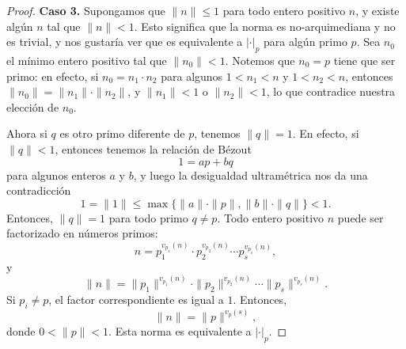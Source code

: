 \documentclass{article}
\numberwithin{equation}{section}
\theoremstyle{definition}
\begin{document}
\begin{proof}
  \noindent\textbf{Caso 3.} Supongamos que $\|n\| \le 1$ para todo entero
  positivo $n$, y existe algún $n$ tal que $\|n\| < 1$. Esto significa que
  la norma es no-arquimediana y no es trivial, y nos gustaría ver que es
  equivalente a $|\cdot|_p$ para algún primo $p$. Sea $n_0$ el mínimo entero
  positivo tal que $\|n_0\| < 1$. Notemos que $n_0 = p$ tiene que ser primo:
  en efecto, si $n_0 = n_1\cdot n_2$ para algunos $1 < n_1 < n$ y $1 < n_2 < n$,
  entonces $\|n_0\| = \|n_1\|\cdot \|n_2\|$, y $\|n_1\| < 1$ o $\|n_2\| < 1$,
  lo que contradice nuestra elección de $n_0$.

  Ahora si $q$ es otro primo diferente de $p$, tenemos $\|q\| = 1$. En efecto,
  si $\|q\| < 1$, entonces tenemos la relación de Bézout
  $$1 = ap + bq$$
  para algunos enteros $a$ y $b$, y luego la desigualdad ultramétrica nos da una
  contradicción
  $$1 = \|1\| \le \max \{ \|a\|\cdot \|p\|, \|b\|\cdot \|q\| \} < 1.$$
  Entonces, $\|q\| = 1$ para todo primo $q \ne p$. Todo entero positivo $n$
  puede ser factorizado en números primos:
  $$n = p_1^{v_{p_1} (n)}\cdot p_2^{v_{p_2} (n)}\cdots p_s^{v_{p_s} (n)},$$
  y
  \[ \|n\| =
     \|p_1\|^{v_{p_1} (n)}\cdot\|p_2\|^{v_{p_2}(n)}\cdots\|p_s\|^{v_{p_s}(n)}. \]
  Si $p_i \ne p$, el factor correspondiente es igual a $1$. Entonces,
  $$\|n\| = \|p\|^{v_p (s)},$$
  donde $0 < \|p\| < 1$. Esta norma es equivalente a $|\cdot|_p$.
\end{proof}
\end{document}

